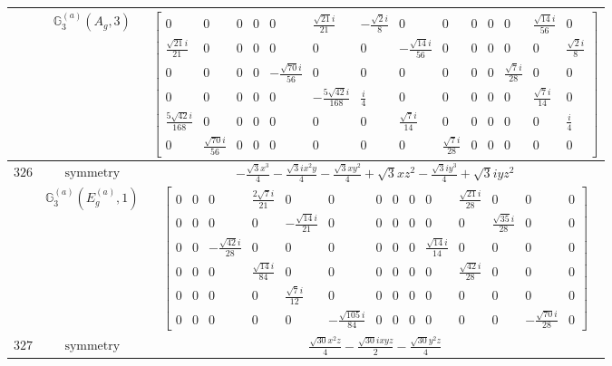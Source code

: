\documentclass[fleqn,8pt,landscape]{jsarticle}
\begin{document}
\begin{longtable}{ccc}
$  $ & $ \mathbb{G}_{3}^{(a)}(A_{g},3) $ & $ \begin{bmatrix} 0 & 0 & 0 & 0 & 0 & \frac{\sqrt{21} i}{21} & - \frac{\sqrt{2} i}{8} & 0 & 0 & 0 & 0 & 0 & \frac{\sqrt{14} i}{56} & 0 \\ \frac{\sqrt{21} i}{21} & 0 & 0 & 0 & 0 & 0 & 0 & - \frac{\sqrt{14} i}{56} & 0 & 0 & 0 & 0 & 0 & \frac{\sqrt{2} i}{8} \\ 0 & 0 & 0 & 0 & - \frac{\sqrt{70} i}{56} & 0 & 0 & 0 & 0 & 0 & 0 & \frac{\sqrt{7} i}{28} & 0 & 0 \\ 0 & 0 & 0 & 0 & 0 & - \frac{5 \sqrt{42} i}{168} & \frac{i}{4} & 0 & 0 & 0 & 0 & 0 & \frac{\sqrt{7} i}{14} & 0 \\ \frac{5 \sqrt{42} i}{168} & 0 & 0 & 0 & 0 & 0 & 0 & \frac{\sqrt{7} i}{14} & 0 & 0 & 0 & 0 & 0 & \frac{i}{4} \\ 0 & \frac{\sqrt{70} i}{56} & 0 & 0 & 0 & 0 & 0 & 0 & \frac{\sqrt{7} i}{28} & 0 & 0 & 0 & 0 & 0 \end{bmatrix} $ \\ \hline
$ 326 $ & $ \text{symmetry} $ & $ - \frac{\sqrt{3} x^{3}}{4} - \frac{\sqrt{3} i x^{2} y}{4} - \frac{\sqrt{3} x y^{2}}{4} + \sqrt{3} x z^{2} - \frac{\sqrt{3} i y^{3}}{4} + \sqrt{3} i y z^{2} $ \\
$  $ & $ \mathbb{G}_{3}^{(a)}(E_{g}^{(a)},1) $ & $ \begin{bmatrix} 0 & 0 & 0 & \frac{2 \sqrt{7} i}{21} & 0 & 0 & 0 & 0 & 0 & 0 & \frac{\sqrt{21} i}{28} & 0 & 0 & 0 \\ 0 & 0 & 0 & 0 & - \frac{\sqrt{14} i}{21} & 0 & 0 & 0 & 0 & 0 & 0 & \frac{\sqrt{35} i}{28} & 0 & 0 \\ 0 & 0 & - \frac{\sqrt{42} i}{28} & 0 & 0 & 0 & 0 & 0 & 0 & \frac{\sqrt{14} i}{14} & 0 & 0 & 0 & 0 \\ 0 & 0 & 0 & \frac{\sqrt{14} i}{84} & 0 & 0 & 0 & 0 & 0 & 0 & \frac{\sqrt{42} i}{28} & 0 & 0 & 0 \\ 0 & 0 & 0 & 0 & \frac{\sqrt{7} i}{12} & 0 & 0 & 0 & 0 & 0 & 0 & 0 & 0 & 0 \\ 0 & 0 & 0 & 0 & 0 & - \frac{\sqrt{105} i}{84} & 0 & 0 & 0 & 0 & 0 & 0 & - \frac{\sqrt{70} i}{28} & 0 \end{bmatrix} $ \\ \hline
$ 327 $ & $ \text{symmetry} $ & $ \frac{\sqrt{30} x^{2} z}{4} - \frac{\sqrt{30} i x y z}{2} - \frac{\sqrt{30} y^{2} z}{4} $ \\

\end{longtable}
\end{document}
